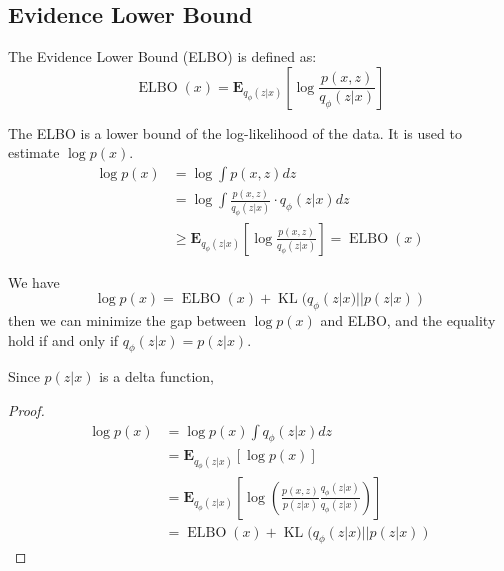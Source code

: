 \subsection{Evidence Lower Bound}
\begin{definition}
    The Evidence Lower Bound (ELBO) is defined as:
    \begin{equation}
        \operatorname{ELBO}(x) = \mathbf{E}_{q_\phi(z|x)}\left[\log \frac{p(x, z)}{q_\phi(z|x)}\right]
    \end{equation}
\end{definition}
\begin{remark}
    The ELBO is a lower bound of the log-likelihood of the data. It is used to estimate $\log p(x)$.
    \begin{equation}
        \begin{aligned}
            \log p(x) &= \log \int p(x, z) dz\\
            & = \log \int \frac{p(x, z)}{q_\phi(z|x)} \cdot q_\phi(z|x) dz\\
            & \geq \mathbf{E}_{q_\phi(z|x)}\left[\log \frac{p(x, z)}{q_\phi(z|x)}\right] = \operatorname{ELBO}(x)
        \end{aligned}
    \end{equation}
\end{remark}
\begin{theorem}
    We have 
    \begin{equation}
        \log p(x) =\operatorname{ELBO}(x) + \operatorname{KL}(q_\phi(z|x)||p(z|x))
    \end{equation}
    then we can minimize the gap between $\log p(x)$ and ELBO, and the equality hold if and only if $q_\phi(z|x)=p(z|x)$.

    Since $p(z|x)$ is a delta function, 
\end{theorem}
\begin{proof}
    \begin{equation}
        \begin{aligned}
            \log p(x) & = \log p(x)\int q_\phi(z|x)dz\\
            &=\mathbf{E}_{q_\phi(z|x)}\left[\log p(x)\right]\\
            & = \mathbf{E}_{q_\phi(z|x)}\left[\log \left(\frac{p(x, z)}{p(z|x)}\frac{q_\phi(z|x)}{q_\phi(z|x)}\right)\right]\\
            & =\operatorname{ELBO}(x) + \operatorname{KL}(q_\phi(z|x)||p(z|x))
        \end{aligned}
    \end{equation}
\end{proof}

